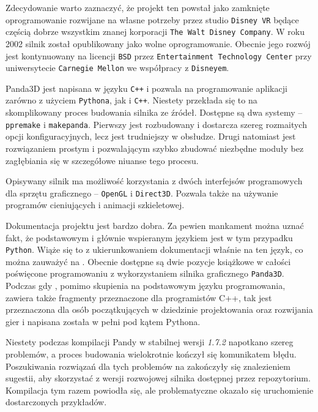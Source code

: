 \documentclass[11pt]{mwrep}
\begin{document}
      Zdecydowanie warto zaznaczyć, że projekt ten powstał jako zamknięte oprogramowanie rozwijane na własne potrzeby przez studio \texttt{Disney VR} będące częścią dobrze wszystkim znanej korporacji \texttt{The Walt Disney Company}. W roku 2002 silnik został opublikowany jako wolne oprogramowanie. Obecnie jego rozwój jest kontynuowany na licencji \texttt{BSD} przez \texttt{Entertainment Technology Center} przy uniwersytecie \texttt{Carnegie Mellon} we współpracy z \texttt{Disneyem}.

      Panda3D jest napisana w języku \texttt{C++} i pozwala na programowanie aplikacji zarówno z użyciem \texttt{Pythona}, jak i \texttt{C++}. Niestety przekłada się to na skomplikowany proces budowania silnika ze źródeł. Dostępne są dwa systemy -- \texttt{ppremake} i \texttt{makepanda}. Pierwszy jest rozbudowany i dostarcza szereg rozmaitych opcji konfiguracyjnych, lecz jest trudniejszy w obsłudze. Drugi natomiast jest rozwiązaniem prostym i pozwalającym szybko zbudować niezbędne moduły bez zagłębiania się w szczegółowe niuanse tego procesu.

      Opisywany silnik ma możliwość korzystania z dwóch interfejsów programowych dla sprzętu graficznego -- \texttt{OpenGL} i \texttt{Direct3D}. Pozwala także na używanie programów cieniujących i animacji szkieletowej.

     Dokumentacja projektu jest bardzo dobra. Za pewien mankament można uznać fakt, że podstawowym i głównie wspieranym językiem jest w tym przypadku \texttt{Python}. Wiąże się to z ukierunkowaniem dokumentacji właśnie na ten język, co można zauważyć na \cite{panda}. Obecnie dostępne są dwie pozycje książkowe w całości poświęcone programowaniu z wykorzystaniem silnika graficznego \texttt{Panda3D}. Podczas gdy \cite{pandab1}, pomimo skupienia na podstawowym języku programowania, zawiera także fragmenty przeznaczone dla programistów C++, tak \cite{pandab2} jest przeznaczona dla osób początkujących w dziedzinie projektowania oraz rozwijania gier i napisana została w pełni pod kątem Pythona.

      Niestety podczas kompilacji Pandy w stabilnej wersji \textit{1.7.2} napotkano szereg problemów, a proces budowania wielokrotnie kończył się komunikatem błędu. Poszukiwania rozwiązań dla tych problemów na \cite{pandaf} zakończyły się znalezieniem sugestii, aby skorzystać z wersji rozwojowej silnika dostępnej przez repozytorium. Kompilacja tym razem powiodła się, ale problematyczne okazało się uruchomienie dostarczonych przykładów. 
\end{document}
